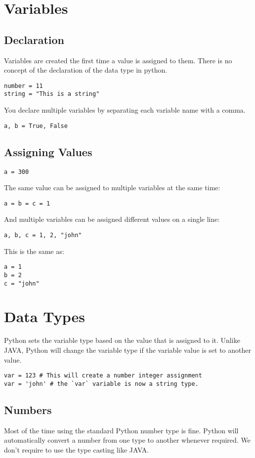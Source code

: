\documentclass[a4paper,9pt]{extarticle}
\begin{document}
\begin{multicols*}{2}
\section{Variables}

\subsection{Declaration}
Variables are created the first time a value is assigned to them. There is no concept of the declaration of the data type in python.
\begin{lstlisting}
number = 11
string = "This is a string"
\end{lstlisting}
You declare multiple variables by separating each variable name with a comma.
\begin{lstlisting}
a, b = True, False
\end{lstlisting}

\subsection{Assigning Values}
\begin{lstlisting}
a = 300
\end{lstlisting}
The same value can be assigned to multiple variables at the same time:
\begin{lstlisting}
a = b = c = 1
\end{lstlisting}
And multiple variables can be assigned different values on a single line:
\begin{lstlisting}
a, b, c = 1, 2, "john"
\end{lstlisting}
This is the same as:
\begin{lstlisting}
a = 1
b = 2
c = "john"
\end{lstlisting}

\section{Data Types}
Python sets the variable type based on the value that is assigned to it. Unlike JAVA, Python will change the variable type if the variable value is set to another value.

\begin{lstlisting}
var = 123 # This will create a number integer assignment
var = 'john' # the `var` variable is now a string type.
\end{lstlisting}

\subsection{Numbers}
Most of the time using the standard Python number type is fine. Python will automatically convert a number from one type to another whenever required. We don't require to use the type casting like JAVA.


\end{multicols*}
\end{document}
